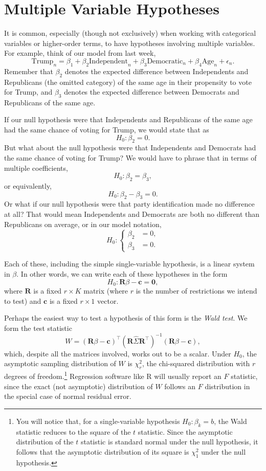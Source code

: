 \documentclass[12pt,oneside,openany]{book}
\begin{document}
\section{Multiple Variable
Hypotheses}\label{multiple-variable-hypotheses}

It is common, especially (though not exclusively) when working with
categorical variables or higher-order terms, to have hypotheses
involving multiple variables. For example, think of our model from last
week, \[
\text{Trump}_n = \beta_1 + \beta_2 \text{Independent}_n + \beta_3 \text{Democratic}_n + \beta_4 \text{Age}_n + \epsilon_n.
\] Remember that \(\beta_2\) denotes the expected difference between
Independents and Republicans (the omitted category) of the same age in
their propensity to vote for Trump, and \(\beta_3\) denotes the expected
difference between Democrats and Republicans of the same age.

If our null hypothesis were that Independents and Republicans of the
same age had the same chance of voting for Trump, we would state that as
\[
H_0 : \beta_2 = 0.
\] But what about the null hypothesis were that Independents and
Democrats had the same chance of voting for Trump? We would have to
phrase that in terms of multiple coefficients, \[
H_0 : \beta_2 = \beta_3,
\] or equivalently, \[
H_0 : \beta_2 - \beta_3 = 0.
\] Or what if our null hypothesis were that party identification made no
difference at all? That would mean Independents and Democrats are both
no different than Republicans on average, or in our model notation, \[
H_0 : \left\{ \begin{aligned}
\beta_2 &= 0, \\
\beta_3 &= 0.
\end{aligned} \right.
\]

Each of these, including the simple single-variable hypothesis, is a
linear system in \(\beta\). In other words, we can write each of these
hypotheses in the form \[
H_0 : \mathbf{R} \beta - \mathbf{c} = \mathbf{0},
\] where \(\mathbf{R}\) is a fixed \(r \times K\) matrix (where \(r\) is
the number of restrictions we intend to test) and \(\mathbf{c}\) is a
fixed \(r \times 1\) vector.

Perhaps the easiest way to test a hypothesis of this form is the
\emph{Wald test}. We form the test statistic \[
W = (\mathbf{R} \beta - \mathbf{c})^\top  (\mathbf{R} \hat{\Sigma} \mathbf{R}^\top)^{-1} (\mathbf{R} \beta - \mathbf{c}),
\] which, despite all the matrices involved, works out to be a scalar.
Under \(H_0\), the asymptotic sampling distribution of \(W\) is
\(\chi^2_r\), the chi-squared distribution with \(r\) degrees of
freedom.\footnote{You will notice that, for a single-variable hypothesis
  \(H_0 : \beta_k = b\), the Wald statistic reduces to the square of the
  \(t\) statistic. Since the asymptotic distribution of the \(t\)
  statistic is standard normal under the null hypothesis, it follows
  that the asymptotic distribution of its square is \(\chi^2_1\) under
  the null hypothesis.} Regression software like R will usually report
an \(F\) statistic, since the exact (not asymptotic) distribution of
\(W\) follows an \(F\) distribution in the special case of normal
residual error.
\end{document}
